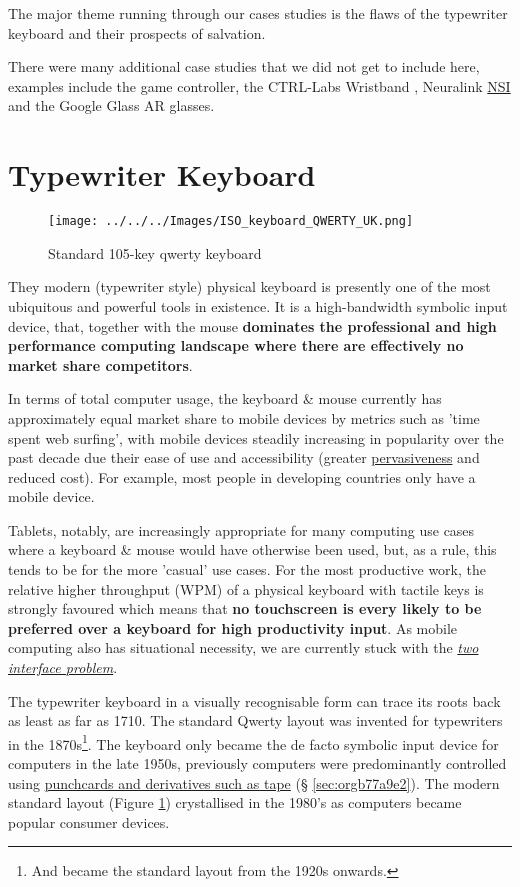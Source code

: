 \documentclass[logo,bsc,singlespacing,parskip]{infthesis}
\begin{document}
The major theme running through our cases studies is the flaws of the typewriter keyboard and their prospects of salvation.

There were many additional case studies that we did not get to include here, examples include the game controller, the CTRL-Labs Wristband \autocite{27CTRLlabsLinkedIn}, Neuralink \hyperref[orgbcfe20a]{NSI} \autocite{muskNeuralink} and the Google Glass AR glasses.
\section{Typewriter Keyboard}
\label{sec:org37d7bd9}
\begin{figure}[h]
\centering
\texttt{[image: ../../../Images/ISO\_keyboard\_QWERTY\_UK.png]}
\caption{\label{fig:stand_keyb}Standard 105-key qwerty keyboard}
\end{figure}

They modern (typewriter style) physical keyboard is presently one of the most ubiquitous and powerful tools in existence.
It is a high-bandwidth symbolic input device, that, together with the mouse \textbf{dominates the professional and high performance computing landscape where there are effectively no market share competitors}.

In terms of total computer usage, the keyboard \& mouse currently has approximately equal market share to mobile devices by metrics such as 'time spent web surfing', with mobile devices steadily increasing in popularity over the past decade due their ease of use and accessibility (greater \hyperref[pervasiveness]{pervasiveness} and reduced cost).
For example, most people in developing countries only have a mobile device.

Tablets, notably, are increasingly appropriate for many computing use cases where a keyboard \& mouse would have otherwise been used, but, as a rule, this tends to be for the more 'casual' use cases.
For the most productive work, the relative higher throughput (WPM) of a physical keyboard with tactile keys is strongly favoured which means that \textbf{no touchscreen is every likely to be preferred over a keyboard for high productivity input}.
As mobile computing also has situational necessity, we are currently stuck with the \emph{\hyperref[two interface problem]{two interface problem}}.

The typewriter keyboard in a visually recognisable form can trace its roots back as least as far as 1710.
The standard Qwerty layout was invented for typewriters in the 1870s\footnote{And became the standard layout from the 1920s onwards.}.
The keyboard only became the de facto symbolic input device for computers in the late 1950s, previously computers were predominantly controlled using \hyperref[sec:orgb77a9e2]{punchcards and derivatives such as tape} (§ \ref{sec:orgb77a9e2}).
The modern standard layout (Figure \ref{fig:stand_keyb}) crystallised in the 1980's as computers became popular consumer devices.
\end{document}

